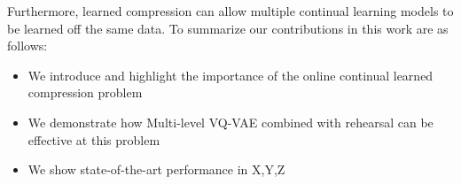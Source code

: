 \documentclass[colorinlistoftodos]{article} %
\begin{document}
Furthermore, learned compression can allow multiple continual learning models to be learned off the same data. 
To summarize our contributions in this work are as follows:
\begin{itemize}
    \item We introduce and highlight the importance of the online continual learned compression problem
    \item We demonstrate how Multi-level VQ-VAE combined with rehearsal\cite{MIR,ER} can be effective at this problem
    \item We show state-of-the-art performance in X,Y,Z
\end{itemize}




	
		
			
\end{document}
